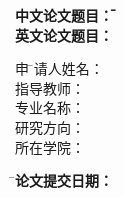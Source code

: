 \begin{tabbing}
\Songti\sanhao\bfseries 中文论文题目：\=\hspace{-4mm}\xunderline[112mm]{\linespread{1.1}\bfseries\Fangsong\xiaoer\centerline\zjutitlec}
\ifthenelse{\equal\zjutitlecb{}}{}{\\[2mm]\>\hspace{-4mm}\xunderline[112mm]{\linespread{1.1}\bfseries\Fangsong\xiaoer\centerline\zjutitlecb}}
\ifthenelse{\equal\zjutitlecc{}}{}{\\[2mm]\>\hspace{-4mm}\xunderline[112mm]{\linespread{1.1}\bfseries\Fangsong\xiaoer\centerline\zjutitlecc}}
\\[2mm]\Songti\sanhao\bfseries 英文论文题目：\>\hspace{-4mm}\xunderline[112mm]{\linespread{1.1}\bfseries\sanhao\TNR\centerline\zjutitlee}
\ifthenelse{\equal\zjutitleeb{}}{}{\\[2mm]\>\hspace{-4mm}\xunderline[112mm]{\linespread{1.1}\bfseries\sanhao\TNR\centerline\zjutitleeb}}
\ifthenelse{\equal\zjutitleec{}}{}{\\[2mm]\>\hspace{-4mm}\xunderline[112mm]{\linespread{1.1}\bfseries\sanhao\TNR\centerline\zjutitleec}}
\end{tabbing}

\vspace{15mm}

\begin{tabbing}
\hspace{25mm} \Songti\sihao 申 \hspace{-2mm} \= \Songti\sihao 请人姓名： \= \underline{\makebox[7cm]{\sihao\zjuauthor}} \\[2mm]
              \> \Songti\sihao 指导教师： \> \underline{\makebox[7cm]{\sihao\zjumentor}} \\[2mm]
              \> \Songti\sihao 专业名称： \> \underline{\makebox[7cm]{\sihao\zjumajor}} \\[2mm]
              \> \Songti\sihao 研究方向： \> \underline{\makebox[7cm]{\sihao\zjusubject}} \\[2mm]
              \> \Songti\sihao 所在学院： \> \underline{\makebox[7cm]{\sihao\zjuschool}}
\end{tabbing}

\vspace{10mm}

\begin{tabbing}
\hspace{30mm} \= \Songti\xiaosan\bfseries 论文提交日期： \= \underline{\makebox[49mm]{\Songti\xiaosan\bfseries\zjuapprovaldate}}
\end{tabbing}

